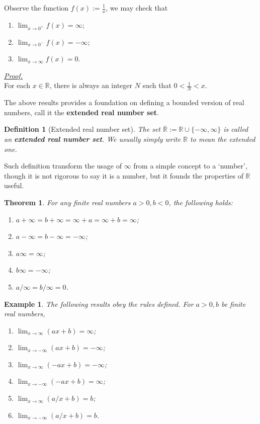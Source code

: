 \documentclass[12pt]{article}
\newtheorem{definition}{Definition}[section]
\newtheorem*{theorem}{Theorem}
\newtheorem*{example}{Example}
\renewenvironment{proof}[1][Proof]{\begin{snugshade*} \underline{\textit{{#1}.}}\\}{\hfill \qedsymbol \end{snugshade*}}
\begin{document}
    Observe the function $f(x):=\frac{1}{x}$, we may check that \begin{enumerate}
        \item $\displaystyle \lim_{x\to 0^+}f(x)=\infty$;
        \item $\displaystyle \lim_{x\to 0^-}f(x)=-\infty$;
        \item $\displaystyle \lim_{x\to \infty}f(x)=0$.
    \end{enumerate}

    \begin{proof}
        For each $x\in\mathbb{R}$, there is always an integer $N$ such that $0<\frac{1}{N}<x$.
    \end{proof}

    The above results provides a foundation on defining a bounded version of real numbers, call it the \textbf{extended real number set}.

    \begin{definition}[Extended real number set]
        The set $\overline{\mathbb{R}}:=\mathbb{R}\cup\{-\infty,\infty\}$ is called an \textbf{extended real number set}. We usually simply write $\mathbb{R}$ to mean the extended one.
    \end{definition}

    Such definition transform the usage of $\infty$ from a simple concept to a `number', though it is not rigorous to say it is a number, but it founds the properties of $\mathbb{R}$ useful.

    \begin{theorem}
        For any finite real numbers $a>0,b<0$, the following holds:\begin{enumerate}
            \item $a+\infty=b+\infty=\infty+a=\infty+b=\infty$;
            \item $a-\infty=b-\infty=-\infty$;
            \item $a\infty=\infty$;
            \item $b\infty=-\infty$;
            \item $a/\infty=b/\infty=0$.
        \end{enumerate}
    \end{theorem}

    \begin{example}
        The following results obey the rules defined. For $a>0,b$ be finite real numbers,
        \begin{enumerate}
            \item $\displaystyle\lim_{x\to \infty}(ax+b)=\infty$;
            \item $\displaystyle\lim_{x\to -\infty}(ax+b)=-\infty$;
            \item $\displaystyle\lim_{x\to \infty}(-ax+b)=-\infty$;
            \item $\displaystyle\lim_{x\to -\infty}(-ax+b)=\infty$;
            \item $\displaystyle\lim_{x\to \infty}(a/x+b)=b$;
            \item $\displaystyle\lim_{x\to -\infty}(a/x+b)=b$.
        \end{enumerate}
    \end{example}
\end{document}
